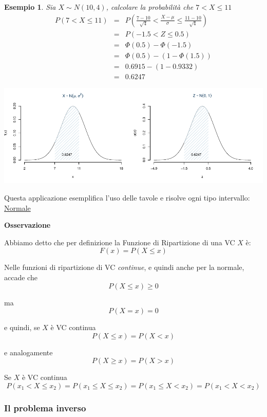 \documentclass[
  11pt,
]{book}
\theoremstyle{mytheoremstyle}
\theoremstyle{mydefstyle}
\newtheorem{example}{{Esempio}}[section]
\begin{document}
\begin{example}

Sia \(X\sim N(10,4)\), calcolare la probabilità che \(7<X\leq 11\)
\begin{eqnarray*}
P(7<X\leq 11) &=& P\left( \frac {7 - 10}{\sqrt{4}} < \frac {X - \mu}\sigma \leq \frac {11 - 10}{\sqrt{4}}\right)  \\
              &=& P\left( -1.5 < Z \leq 0.5\right) \\
              &=& \Phi(0.5)-\Phi(-1.5)\\
              &=& \Phi(0.5)-(1-\Phi(1.5))\\
              &=& 0.6915-(1-0.9332)\\
              &=& 0.6247
\end{eqnarray*}

\begin{center}\includegraphics{Appunti_di_Statistica_2025_files/figure-latex/07c-Normale-26,-1} \end{center}

\end{example}

Questa applicazione esemplifica l'uso delle tavole e risolve ogni tipo intervallo: \href{https://patrizio-frederic.shinyapps.io/normale/}{Normale}

\textbf{Osservazione}

Abbiamo detto che per definizione la Funzione di Ripartizione di una VC \(X\) è:
\[F(x)=P(X\leq x)\]

Nelle funzioni di ripartizione di VC \emph{continue}, e quindi anche per la normale, accade che
\[P(X\leq x)\geq 0\]

ma
\[P(X=x)=0\]

e quindi, se \(X\) è VC continua
\[P(X\leq x)=P(X<x)\]

e analogamente
\[P(X\geq x)=P(X>x)\]

Se \(X\) è VC continua
\[P(x_1<X\leq x_2)=P(x_1\leq X \leq x_2)=P(x_1\leq X < x_2)=P(x_1<X<x_2)\]

\subsubsection{Il problema inverso}\label{il-problema-inverso}
\end{document}
